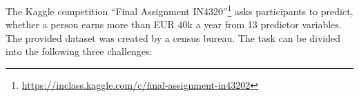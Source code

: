 The Kaggle competition ``Final Assignment IN4320''\footnote{\url{https://inclass.kaggle.com/c/final-assignment-in43202}} asks participants to predict, whether a person earns more than EUR 40k a year from 13 predictor variables. The provided dataset was created by a census bureau. The task can be divided into the following three challenges: